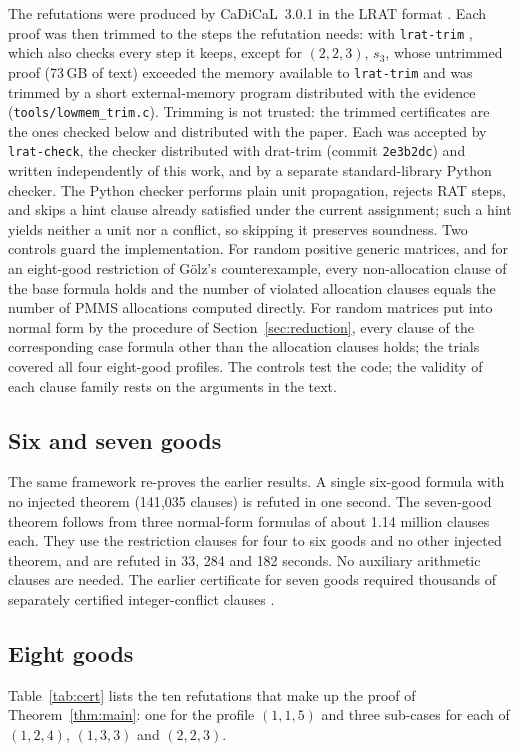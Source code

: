 \documentclass[11pt,a4paper]{article}
\theoremstyle{remark}
\begin{document}
The refutations were produced by CaDiCaL~3.0.1 \cite{Cadical} in the LRAT format \cite{CHHKS17}. Each proof was then trimmed to the steps the refutation needs: with \texttt{lrat-trim} \cite{LratTrim}, which also checks every step it keeps, except for $(2,2,3)$, $s_3$, whose untrimmed proof (73\,GB of text) exceeded the memory available to \texttt{lrat-trim} and was trimmed by a short external-memory program distributed with the evidence (\texttt{tools/lowmem\_trim.c}). Trimming is not trusted: the trimmed certificates are the ones checked below and distributed with the paper. Each was accepted by \texttt{lrat-check}, the checker distributed with drat-trim (commit \texttt{2e3b2dc}) and written independently of this work, and by a separate standard-library Python checker. The Python checker performs plain unit propagation, rejects RAT steps, and skips a hint clause already satisfied under the current assignment; such a hint yields neither a unit nor a conflict, so skipping it preserves soundness. Two controls guard the implementation. For random positive generic matrices, and for an eight-good restriction of G\"olz's counterexample, every non-allocation clause of the base formula holds and the number of violated allocation clauses equals the number of PMMS allocations computed directly. For random matrices put into normal form by the procedure of Section~\ref{sec:reduction}, every clause of the corresponding case formula other than the allocation clauses holds; the trials covered all four eight-good profiles. The controls test the code; the validity of each clause family rests on the arguments in the text.

\subsection{Six and seven goods}
The same framework re-proves the earlier results. A single six-good formula with no injected theorem (141{,}035 clauses) is refuted in one second. The seven-good theorem follows from three normal-form formulas of about 1.14 million clauses each. They use the restriction clauses for four to six goods and no other injected theorem, and are refuted in 33, 284 and 182 seconds. No auxiliary arithmetic clauses are needed. The earlier certificate for seven goods required thousands of separately certified integer-conflict clauses \cite{Anon7}.

\subsection{Eight goods}
Table~\ref{tab:cert} lists the ten refutations that make up the proof of Theorem~\ref{thm:main}: one for the profile $(1,1,5)$ and three sub-cases for each of $(1,2,4)$, $(1,3,3)$ and $(2,2,3)$.
\end{document}
